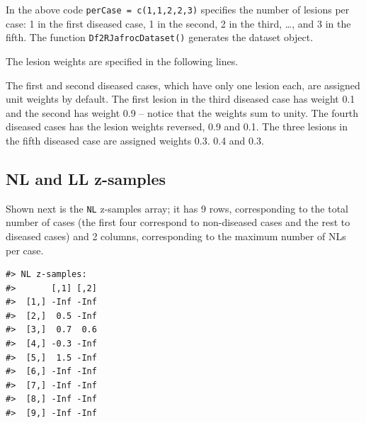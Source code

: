 \documentclass[
]{book}
\newenvironment{Shaded}{\begin{snugshade}}{\end{snugshade}}
\newcommand{\ConstantTok}[1]{\textcolor[rgb]{0.00,0.00,0.00}{#1}}
\newcommand{\DecValTok}[1]{\textcolor[rgb]{0.00,0.00,0.81}{#1}}
\newcommand{\FloatTok}[1]{\textcolor[rgb]{0.00,0.00,0.81}{#1}}
\newcommand{\FunctionTok}[1]{\textcolor[rgb]{0.00,0.00,0.00}{#1}}
\newcommand{\NormalTok}[1]{#1}
\newcommand{\OtherTok}[1]{\textcolor[rgb]{0.56,0.35,0.01}{#1}}
\newcommand{\SpecialCharTok}[1]{\textcolor[rgb]{0.00,0.00,0.00}{#1}}
\begin{document}
In the above code \texttt{perCase\ =\ c(1,1,2,2,3)} specifies the number of lesions per case: 1 in the first diseased case, 1 in the second, 2 in the third, \ldots, and 3 in the fifth. The function \texttt{Df2RJafrocDataset()} generates the dataset object.

The lesion weights are specified in the following lines.

\begin{Shaded}
\end{Shaded}

The first and second diseased cases, which have only one lesion each, are assigned unit weights by default. The first lesion in the third diseased case has weight 0.1 and the second has weight 0.9 -- notice that the weights sum to unity. The fourth diseased cases has the lesion weights reversed, 0.9 and 0.1. The three lesions in the fifth diseased case are assigned weights 0.3. 0.4 and 0.3.

\hypertarget{nl-and-ll-z-samples}{%
\subsection{NL and LL z-samples}\label{nl-and-ll-z-samples}}

Shown next is the \texttt{NL} z-samples array; it has 9 rows, corresponding to the total number of cases (the first four correspond to non-diseased cases and the rest to diseased cases) and 2 columns, corresponding to the maximum number of NLs per case.

\begin{verbatim}
#> NL z-samples:
#>       [,1] [,2]
#>  [1,] -Inf -Inf
#>  [2,]  0.5 -Inf
#>  [3,]  0.7  0.6
#>  [4,] -0.3 -Inf
#>  [5,]  1.5 -Inf
#>  [6,] -Inf -Inf
#>  [7,] -Inf -Inf
#>  [8,] -Inf -Inf
#>  [9,] -Inf -Inf
\end{verbatim}
\end{document}
